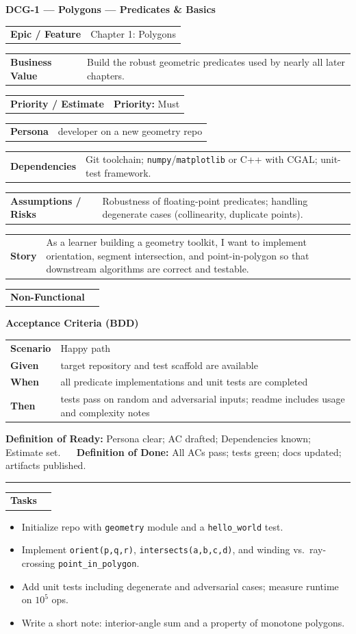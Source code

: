 \documentclass[11pt,a4paper]{article}
\makeatletter
\newcommand{\FieldRow}[2]{%
  \noindent\begin{tabularx}{\linewidth}{@{}>{\bfseries}l X@{}}#1 & #2\\\end{tabularx}%
}
\newcommand{\CardDivider}{\par\noindent\color{CardBorder}\rule{\linewidth}{0.4pt}\par\noindent\color{black}}
\newcommand{\StoryHeader}[2]{%
  {\large\bfseries \textcolor{CardTitle}{#1} --- #2}
}
\newcommand{\BDD}[4]{%
  \par\noindent\textbf{Acceptance Criteria (BDD)}\par\nobreak
  \noindent\begin{tabularx}{\linewidth}{@{}>{\bfseries}l X@{}}
  Scenario & #1\\
  Given & #2\\
  When & #3\\
  Then & #4\\
  \end{tabularx}\par
}
\newenvironment{TaskList}{%
  \begin{itemize}[leftmargin=1.25em,label=\(\square\)]
}{\end{itemize}}
\newcommand{\DefinitionLine}[2]{%
  {\footnotesize\color{Muted}\textbf{#1:} #2}%
}
\makeatother
\begin{document}
\begin{StoryCardBox}
\StoryHeader{DCG-1}{Polygons — Predicates \& Basics}\\[0.4em]
\FieldRow{Epic / Feature}{Chapter 1: Polygons}
\FieldRow{Business Value}{Build the robust geometric predicates used by nearly all later chapters.}
\FieldRow{Priority / Estimate}{\textbf{Priority:} Must \quad \nfchip{SP: 3}}
\FieldRow{Persona}{developer on a new geometry repo}
\FieldRow{Dependencies}{Git toolchain; \texttt{numpy}/\texttt{matplotlib} or C++ with CGAL; unit-test framework.}
\FieldRow{Assumptions / Risks}{Robustness of floating-point predicates; handling degenerate cases (collinearity, duplicate points).}
\FieldRow{Story}{As a learner building a geometry toolkit, I want to implement orientation, segment intersection, and point-in-polygon so that downstream algorithms are correct and testable.}

\FieldRow{Non-Functional}{\nfchip{Rigor} \nfchip{Reproducibility} \nfchip{Clarity} \nfchip{Performance}}

\BDD{Happy path}{target repository and test scaffold are available}{all predicate implementations and unit tests are completed}{tests pass on random and adversarial inputs; readme includes usage and complexity notes}

\DefinitionLine{Definition of Ready}{Persona clear; AC drafted; Dependencies known; Estimate set.} \,\, \textbullet \,\,
\DefinitionLine{Definition of Done}{All ACs pass; tests green; docs updated; artifacts published.}

\CardDivider
\FieldRow{\large Tasks}{}
\begin{TaskList}
  \item Initialize repo with \texttt{geometry} module and a \texttt{hello\_world} test.
  \item Implement \texttt{orient(p,q,r)}, \texttt{intersects(a,b,c,d)}, and winding vs.\ ray-crossing \texttt{point\_in\_polygon}.
  \item Add unit tests including degenerate and adversarial cases; measure runtime on \(10^5\) ops.
  \item Write a short note: interior-angle sum and a property of monotone polygons.
\end{TaskList}
\end{StoryCardBox}
\end{document}
